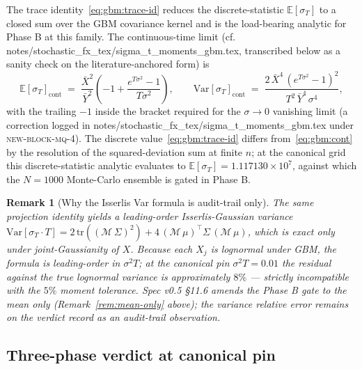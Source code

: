 \documentclass[11pt,letterpaper]{article}
\newtheorem{remark}{Remark}[section]
\newcommand{\E}{\mathbb{E}}
\newcommand{\Var}{\text{Var}}
\newcommand{\sigmaT}{\sigma_{T}}
\newcommand{\Xbar}{\bar{X}}
\newcommand{\Ybar}{\bar{Y}}
\newcommand{\centerProj}{\mathcal{M}}
\begin{document}
The trace identity~\eqref{eq:gbm:trace-id} reduces the discrete-statistic
$\E[\sigmaT]$ to a closed sum over the GBM covariance kernel and is the
load-bearing analytic for Phase B at this family. The continuous-time
limit (cf. \textsf{notes/stochastic\_fx\_tex/sigma\_t\_moments\_gbm.tex},
transcribed below as a sanity check on the literature-anchored form) is
\begin{equation}
    \E[\sigmaT]_{\text{cont}}
    \;=\;
    \frac{\Xbar^{2}}{\Ybar^{2}}
    \left(-1 + \frac{e^{T\sigma^{2}} - 1}{T\sigma^{2}}\right),
    \qquad
    \Var[\sigmaT]_{\text{cont}}
    \;=\;
    \frac{2\,\Xbar^{4}\,(e^{T\sigma^{2}} - 1)^{2}}{T^{2}\,\Ybar^{4}\,\sigma^{4}},
    \label{eq:gbm:cont}
\end{equation}
with the trailing $-1$ inside the bracket required for the
$\sigma \to 0$ vanishing limit (a correction logged in
\textsf{notes/stochastic\_fx\_tex/sigma\_t\_moments\_gbm.tex} under
\textsc{new-block-mq-4}). The discrete value~\eqref{eq:gbm:trace-id}
differs from~\eqref{eq:gbm:cont} by the resolution of the squared-deviation
sum at finite $n$; at the canonical grid this discrete-statistic analytic
evaluates to $\E[\sigmaT] = 1.117130\times 10^{7}$, against which the
$N = 1000$ Monte-Carlo ensemble is gated in Phase B.

\begin{remark}[Why the Isserlis Var formula is audit-trail only]
\label{rem:gbm:var}
The same projection identity yields a leading-order Isserlis-Gaussian
variance
$\Var[\sigmaT \cdot T] = 2\,\mathrm{tr}((\centerProj\,\Sigma)^{2}) +
4\,(\centerProj\,\mu)^{\top}\Sigma\,(\centerProj\,\mu)$, which is exact
only under joint-Gaussianity of $X$. Because each $X_{j}$ is lognormal
under GBM, the formula is leading-order in $\sigma^{2}T$; at the
canonical pin $\sigma^{2}T = 0.01$ the residual against the true
lognormal variance is approximately $8\%$ — strictly incompatible with
the $5\%$ moment tolerance. Spec v0.5 \S11.6 amends the Phase B gate to
the mean only (Remark~\ref{rem:mean-only} above); the variance relative
error remains on the verdict record as an audit-trail observation.
\end{remark}

\subsection{Three-phase verdict at canonical pin}
\label{sec:gbm:verdict}
\end{document}
